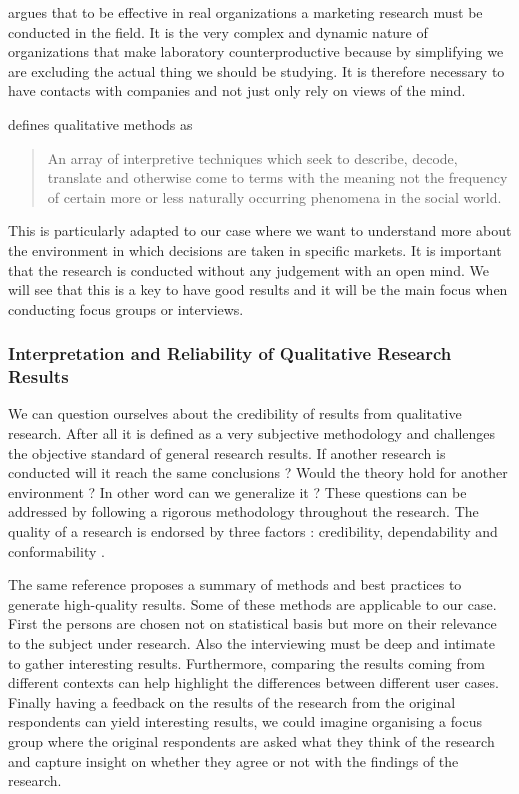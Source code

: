 \documentclass[10pt]{report}
\begin{document}
\autocite{mintzberg1979} argues that to be effective in real organizations a marketing research must be conducted in the field. It is the very complex and dynamic nature of organizations that make laboratory counterproductive because by simplifying we are excluding the actual thing we should be studying. It is therefore necessary to have contacts with companies and not just only rely on views of the mind.

\autocite{van1979reclaiming} defines qualitative methods as 
\begin{quote}
An array of interpretive techniques which seek to describe, decode, translate and otherwise come to terms with the meaning not the frequency of certain more or less naturally occurring phenomena in the social world.
\end{quote}
This is particularly adapted to our case where we want to understand more about the environment in which decisions are taken in specific markets. It is important that the research is conducted without any judgement with an open mind. We will see that this is a key to have good results and it will be the main focus when conducting focus groups or interviews.

\subsubsection{Interpretation and Reliability of Qualitative Research Results}
We can question ourselves about the credibility of results from qualitative research. After all it is defined as a very subjective methodology and challenges the objective standard of general research results. If another research is conducted will it reach the same conclusions ? Would the theory hold for another environment ? In other word can we generalize it ? These questions can be addressed by following a rigorous methodology throughout the research. The quality of a research is endorsed by three factors : credibility, dependability and conformability \autocite{carson2001}.

The same reference proposes a summary of methods and best practices to generate high-quality results. Some of these methods are applicable to our case. First the persons are chosen not on statistical basis but more on their relevance to the subject under research. Also the interviewing must be deep and intimate to gather interesting results. Furthermore, comparing the results coming from different contexts can help highlight the differences between different user cases. Finally having a feedback on the results of the research from the original respondents can yield interesting results, we could imagine organising a focus group where the original respondents are asked what they think of the research and capture insight on whether they agree or not with the findings of the research.
\end{document}
